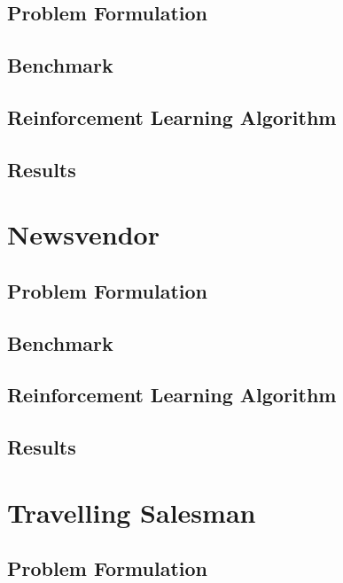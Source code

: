 \documentclass[12pt]{article}
\begin{document}
\lipsum[1]

\subsection{Problem Formulation}

\subsection{Benchmark}

\subsection{Reinforcement Learning Algorithm}

\subsection{Results}

\section{Newsvendor}



\subsection{Problem Formulation}

\subsection{Benchmark}

\subsection{Reinforcement Learning Algorithm}

\subsection{Results}

\section{Travelling Salesman}

\lipsum[1]

\subsection{Problem Formulation}
\end{document}
